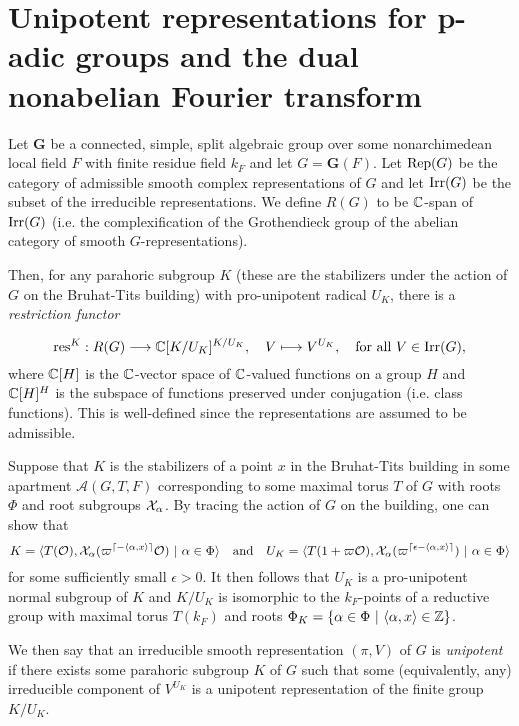 \section{Unipotent representations for p-adic groups and the dual nonabelian Fourier transform}

Let $\mathbf{G}$ be a connected, simple, split algebraic group over some nonarchimedean local field $F$ with finite residue field $k_F$ and let $G=\mathbf{G}(F)$. Let $\mathrm{Rep}(G)$ be the category of admissible smooth complex representations of $G$ and let $\mathrm{Irr}(G)$ be the subset of the irreducible representations. We define $R(G)$ to be $\mathbb{C}$-span of $\mathrm{Irr}(G)$ (i.e. the complexification of the Grothendieck group of the abelian category of smooth $G$-representations).

Then, for any parahoric subgroup $K$ (these are the stabilizers under the action of $G$ on the Bruhat-Tits building) with pro-unipotent radical $U_K$, there is a \textit{restriction functor}

\begin{equation*}
    \mathrm{res}^K:R(G)\longrightarrow \mathbb{C}[K/U_K]^{K/U_K},\quad V\longmapsto V^{U_K},\quad\text{for all }V\in\mathrm{Irr}(G),
\end{equation*}
where $\mathbb{C}[H]$ is the $\mathbb{C}$-vector space of $\mathbb{C}$-valued functions on a group $H$ and $\mathbb{C}[H]^H$ is the subspace of functions preserved under conjugation (i.e. class functions). This is well-defined since the representations are assumed to be admissible. 

\begin{remark}
    Suppose that $K$ is the stabilizers of a point $x$ in the Bruhat-Tits building in some apartment $\mathcal{A}(G,T,F)$ corresponding to some maximal torus $T$ of $G$ with roots $\Phi$ and root subgroups $\mathcal{X}_\alpha$. By tracing the action of $G$ on the building, one can show that 
    $$K=\langle T(\cO),\cX_\alpha(\varpi^{\lceil-\langle\alpha,x\rangle\rceil}\cO)\ |\ \alpha\in\Phi\rangle\quad\text{and}\quad U_K=\langle T(1+\varpi\cO),\cX_\alpha(\varpi^{\lceil\epsilon-\langle\alpha,x\rangle\rceil})\ |\ \alpha\in\Phi\rangle$$
    for some sufficiently small $\epsilon>0$. It then follows that 
    $U_K$ is a pro-unipotent normal subgroup of $K$ and $K/U_K$ is isomorphic to the $k_F$-points of a reductive group with maximal torus $T(k_F)$ and roots $\Phi_K=\{\alpha\in\Phi\ |\ \langle\alpha,x\rangle\in\ZZ\}$.
\end{remark}

We then say that an irreducible smooth representation $(\pi,V)$ of $G$ is \textit{unipotent} if there exists some parahoric subgroup $K$ of $G$ such that some (equivalently, any) irreducible component of $V^{U_K}$ is a unipotent representation of the finite group $K/U_K$.

